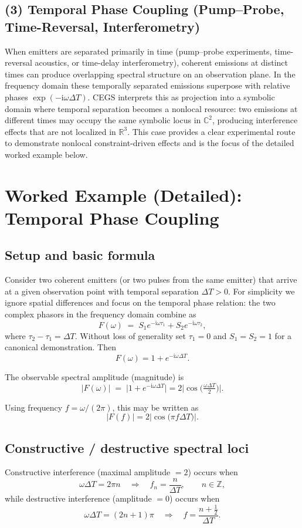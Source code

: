 \documentclass[11pt]{article}
\theoremstyle{plain}
\theoremstyle{definition}
\theoremstyle{remark}
\begin{document}
\subsection*{(3) Temporal Phase Coupling (Pump–Probe, Time-Reversal, Interferometry)}
When emitters are separated primarily in time (pump–probe experiments, time-reversal
acoustics, or time-delay interferometry), coherent emissions at distinct times can
produce overlapping spectral structure on an observation plane. In the frequency
domain these temporally separated emissions superpose with relative phases
\(\exp(-\mathrm{i}\omega \Delta T)\). CEGS interprets this as projection into a
symbolic domain where temporal separation becomes a nonlocal resource: two
emissions at different times may occupy the same symbolic locus in \(\mathbb{C}^2\),
producing interference effects that are not localized in \(\mathbb{R}^3\). This
case provides a clear experimental route to demonstrate nonlocal constraint-driven
effects and is the focus of the detailed worked example below.

\section*{Worked Example (Detailed): Temporal Phase Coupling}

\subsection*{Setup and basic formula}
Consider two coherent emitters (or two pulses from the same emitter) that arrive at a
given observation point with temporal separation \(\Delta T>0\). For simplicity we
ignore spatial differences and focus on the temporal phase relation: the two
complex phasors in the frequency domain combine as
\[
F(\omega) \;=\; S_1 e^{-\mathrm{i}\omega \tau_1} + S_2 e^{-\mathrm{i}\omega \tau_2},
\]
where \(\tau_2-\tau_1=\Delta T\). Without loss of generality set \(\tau_1=0\)
and \(S_1=S_2=1\) for a canonical demonstration. Then
\[
F(\omega) = 1 + e^{-\mathrm{i}\omega \Delta T}.
\]

The observable spectral amplitude (magnitude) is
\[
|F(\omega)| \;=\; \big|1 + e^{-\mathrm{i}\omega \Delta T}\big|
= 2\big|\cos\!\big(\tfrac{\omega\Delta T}{2}\big)\big|.
\]

Using frequency \(f=\omega/(2\pi)\), this may be written as
\[
|F(f)| = 2\big|\cos\!\big(\pi f \Delta T\big)\big|.
\]

\subsection*{Constructive / destructive spectral loci}
Constructive interference (maximal amplitude \(=2\)) occurs when
\[
\omega \Delta T = 2\pi n \quad\Longrightarrow\quad f_n = \frac{n}{\Delta T},\qquad n\in\mathbb{Z},
\]
while destructive interference (amplitude \(=0\)) occurs when
\[
\omega \Delta T = (2n+1)\pi \quad\Longrightarrow\quad f = \frac{n+\tfrac12}{\Delta T}.
\]
\end{document}
